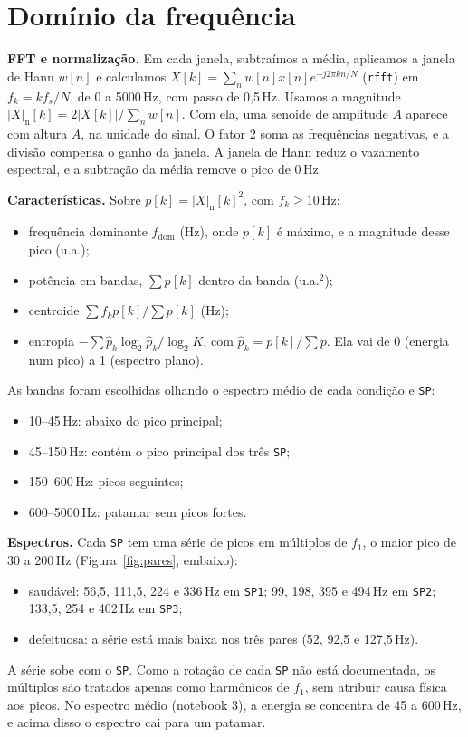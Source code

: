 \documentclass[10pt,a4paper]{article}
\newcommand{\cod}[1]{\texttt{#1}}
\begin{document}
\section{Domínio da frequência}
\label{sec:frequencia}

\textbf{FFT e normalização.} Em cada janela, subtraímos a média, aplicamos a janela de Hann $w[n]$ e calculamos $X[k] = \sum_n w[n]x[n]e^{-j2\pi kn/N}$ (\cod{rfft}) em $f_k = k f_s/N$, de 0 a 5000\,Hz, com passo de 0,5\,Hz.
Usamos a magnitude $|X|_\text{n}[k] = 2|X[k]|/\sum_n w[n]$.
Com ela, uma senoide de amplitude $A$ aparece com altura $A$, na unidade do sinal.
O fator 2 soma as frequências negativas, e a divisão compensa o ganho da janela.
A janela de Hann reduz o vazamento espectral, e a subtração da média remove o pico de 0\,Hz.

\textbf{Características.} Sobre $p[k] = |X|_\text{n}[k]^2$, com $f_k \ge 10$\,Hz:
\begin{itemize}
  \item frequência dominante $f_\text{dom}$ (Hz), onde $p[k]$ é máximo, e a magnitude desse pico (u.a.);
  \item potência em bandas, $\sum p[k]$ dentro da banda (u.a.$^2$);
  \item centroide $\sum f_k p[k]/\sum p[k]$ (Hz);
  \item entropia $-\sum \hat p_k\log_2\hat p_k/\log_2 K$, com $\hat p_k = p[k]/\sum p$. Ela vai de 0 (energia num pico) a 1 (espectro plano).
\end{itemize}
As bandas foram escolhidas olhando o espectro médio de cada condição e \cod{SP}:
\begin{itemize}
  \item 10--45\,Hz: abaixo do pico principal;
  \item 45--150\,Hz: contém o pico principal dos três \cod{SP};
  \item 150--600\,Hz: picos seguintes;
  \item 600--5000\,Hz: patamar sem picos fortes.
\end{itemize}

\textbf{Espectros.} Cada \cod{SP} tem uma série de picos em múltiplos de $f_1$, o maior pico de 30 a 200\,Hz (Figura~\ref{fig:pares}, embaixo):
\begin{itemize}
  \item saudável: 56,5, 111,5, 224 e 336\,Hz em \cod{SP1}; 99, 198, 395 e 494\,Hz em \cod{SP2}; 133,5, 254 e 402\,Hz em \cod{SP3};
  \item defeituosa: a série está mais baixa nos três pares (52, 92,5 e 127,5\,Hz).
\end{itemize}
A série sobe com o \cod{SP}.
Como a rotação de cada \cod{SP} não está documentada, os múltiplos são tratados apenas como harmônicos de $f_1$, sem atribuir causa física aos picos.
No espectro médio (notebook 3), a energia se concentra de 45 a 600\,Hz, e acima disso o espectro cai para um patamar.
\end{document}
